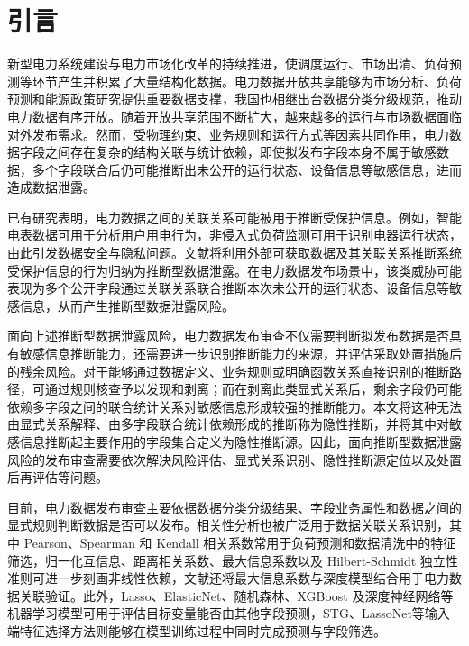 \documentclass[UTF8,zihao=5,twoside,fontset=none]{ctexart}
\begin{document}
\section{引言}

新型电力系统建设与电力市场化改革的持续推进，使调度运行、市场出清、负荷预测等环节产生并积累了大量结构化数据\cite{ref-liu-cps}。电力数据开放共享能够为市场分析、负荷预测和能源政策研究提供重要数据支撑\cite{ref-zhu-sharing}，我国也相继出台数据分类分级规范，推动电力数据有序开放\cite{ref-gbt-classify}。随着开放共享范围不断扩大，越来越多的运行与市场数据面临对外发布需求。然而，受物理约束、业务规则和运行方式等因素共同作用，电力数据字段之间存在复杂的结构关联与统计依赖，即使拟发布字段本身不属于敏感数据，多个字段联合后仍可能推断出未公开的运行状态、设备信息等敏感信息，进而造成数据泄露。

已有研究表明，电力数据之间的关联关系可能被用于推断受保护信息。例如，智能电表数据可用于分析用户用电行为\cite{ref-sankar,ref-giaconi}，非侵入式负荷监测可用于识别电器运行状态\cite{ref-chen-privacy,ref-wang-meter}，由此引发数据安全与隐私问题\cite{ref-adewole,ref-zhang-sgcc,ref-xi-fdia}。文献\cite{ref-liu-data-inference}将利用外部可获取数据及其关联关系推断系统受保护信息的行为归纳为推断型数据泄露。在电力数据发布场景中，该类威胁可能表现为多个公开字段通过关联关系联合推断本次未公开的运行状态、设备信息等敏感信息，从而产生推断型数据泄露风险。

面向上述推断型数据泄露风险，电力数据发布审查不仅需要判断拟发布数据是否具有敏感信息推断能力，还需要进一步识别推断能力的来源，并评估采取处置措施后的残余风险。对于能够通过数据定义、业务规则或明确函数关系直接识别的推断路径，可通过规则核查予以发现和剥离；而在剥离此类显式关系后，剩余字段仍可能依赖多字段之间的联合统计关系对敏感信息形成较强的推断能力。本文将这种无法由显式关系解释、由多字段联合统计依赖形成的推断称为隐性推断，并将其中对敏感信息推断起主要作用的字段集合定义为隐性推断源。因此，面向推断型数据泄露风险的发布审查需要依次解决风险评估、显式关系识别、隐性推断源定位以及处置后再评估等问题。

目前，电力数据发布审查主要依据数据分类分级结果、字段业务属性和数据之间的显式规则判断数据是否可以发布。相关性分析也被广泛用于数据关联关系识别，其中 Pearson、Spearman 和 Kendall 相关系数\cite{ref-pearson,ref-spearman,ref-kendall}常用于负荷预测和数据清洗中的特征筛选\cite{ref-lan-load,ref-jiao-pv,ref-deng-load,ref-wang-evload}，归一化互信息\cite{ref-cover-info}、距离相关系数\cite{ref-szekely-dcorr}、最大信息系数\cite{ref-reshef-mic}以及 Hilbert-Schmidt 独立性准则\cite{ref-gretton-hsic}可进一步刻画非线性依赖，文献\cite{ref-xing-micdnn}还将最大信息系数与深度模型结合用于电力数据关联验证。此外，Lasso、ElasticNet、随机森林、XGBoost 及深度神经网络等机器学习模型可用于评估目标变量能否由其他字段预测\cite{ref-tibshirani-lasso,ref-zou-enet,ref-breiman-rf,ref-chen-xgboost,ref-lecun-deep,ref-li-feature}，STG\cite{ref-stg}、LassoNet\cite{ref-lassonet}等输入端特征选择方法则能够在模型训练过程中同时完成预测与字段筛选。
\end{document}
